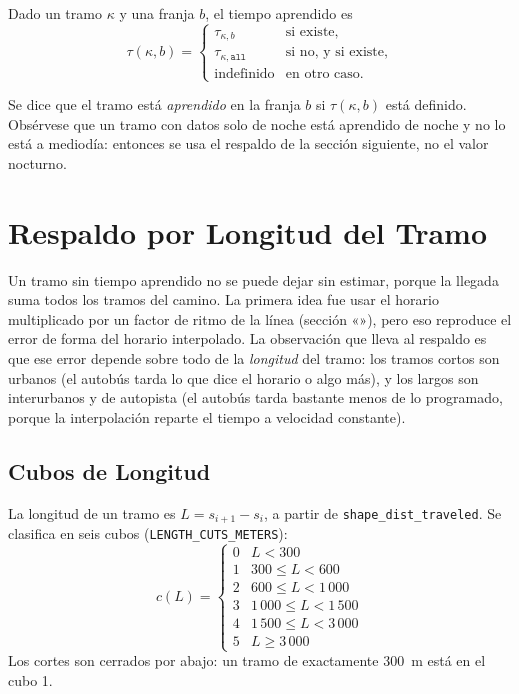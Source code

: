 Dado un tramo $\kappa$ y una franja $b$, el tiempo aprendido es
\begin{equation}
\label{eq:consulta-tramo}
\tau(\kappa,b)=\begin{cases}
\tau_{\kappa,b} & \text{si existe},\\
\tau_{\kappa,\texttt{all}} & \text{si no, y si existe},\\
\text{indefinido} & \text{en otro caso.}
\end{cases}
\end{equation}

Se dice que el tramo está \emph{aprendido} en la franja $b$ si $\tau(\kappa,b)$ está definido. Obsérvese que un tramo
con datos solo de noche está aprendido de noche y no lo está a mediodía: entonces se usa el respaldo de la sección
siguiente, no el valor nocturno.

\section{Respaldo por Longitud del Tramo}
\label{sec:respaldo-largo}

Un tramo sin tiempo aprendido no se puede dejar sin estimar, porque la llegada suma todos los tramos del camino. La
primera idea fue usar el horario multiplicado por un factor de ritmo de la línea (sección «»), pero eso
reproduce el error de forma del horario interpolado. La observación que lleva al respaldo es que ese error depende
sobre todo de la \emph{longitud} del tramo: los tramos cortos son urbanos (el autobús tarda lo que dice el horario o
algo más), y los largos son interurbanos y de autopista (el autobús tarda bastante menos de lo programado, porque la
interpolación reparte el tiempo a velocidad constante).

\subsection{Cubos de Longitud}

La longitud de un tramo es $L=s_{i+1}-s_i$, a partir de \texttt{shape\_dist\_traveled}. Se clasifica en seis cubos
(\texttt{LENGTH\_CUTS\_METERS}):
\begin{equation}
\label{eq:cubo}
c(L)=\begin{cases}
0 & L<300\\
1 & 300\le L<600\\
2 & 600\le L<1\,000\\
3 & 1\,000\le L<1\,500\\
4 & 1\,500\le L<3\,000\\
5 & L\ge3\,000
\end{cases}
\end{equation}
Los cortes son cerrados por abajo: un tramo de exactamente 300~m está en el cubo 1.


